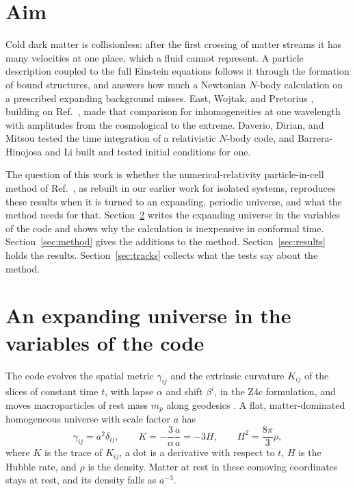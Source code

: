 \documentclass[aps,prd,twocolumn,10pt,superscriptaddress,nofootinbib,longbibliography,floatfix]{revtex4-2}
\begin{document}
\maketitle

\section{Aim}\label{sec:aim}

Cold dark matter is collisionless: after the first crossing of matter streams it has many velocities at one place, which a fluid cannot represent. A particle description coupled to the full Einstein equations follows it through the formation of bound structures, and answers how much a Newtonian $N$-body calculation on a prescribed expanding background misses. East, Wojtak, and Pretorius \cite{East:2019chx}, building on Ref.~\cite{East:2017qmk}, made that comparison for inhomogeneities at one wavelength with amplitudes from the cosmological to the extreme. Daverio, Dirian, and Mitsou \cite{Daverio:2019gql} tested the time integration of a relativistic $N$-body code, and Barrera-Hinojosa and Li \cite{Barrera-Hinojosa:2019mzo,Barrera-Hinojosa:2020arz} built and tested initial conditions for one.

The question of this work is whether the numerical-relativity particle-in-cell method of Ref.~\cite{Wu:2026nrpic}, as rebuilt in our earlier work for isolated systems, reproduces these results when it is turned to an expanding, periodic universe, and what the method needs for that. Section~\ref{sec:system} writes the expanding universe in the variables of the code and shows why the calculation is inexpensive in conformal time. Section~\ref{sec:method} gives the additions to the method. Section~\ref{sec:results} holds the results. Section~\ref{sec:tracks} collects what the tests say about the method.

\section{An expanding universe in the variables of the code}\label{sec:system}

The code evolves the spatial metric $\gamma_{ij}$ and the extrinsic curvature $K_{ij}$ of the slices of constant time $t$, with lapse $\alpha$ and shift $\beta^i$, in the Z4c formulation, and moves macroparticles of rest mass $m_p$ along geodesics \cite{Wu:2026nrpic}. A flat, matter-dominated homogeneous universe with scale factor $a$ has
\begin{equation}\label{eq:flrw}
\gamma_{ij} = a^2 \delta_{ij}, \qquad K = -\frac{3}{\alpha}\frac{\dot a}{a} = -3H, \qquad H^2 = \frac{8\pi}{3}\rho ,
\end{equation}
where $K$ is the trace of $K_{ij}$, a dot is a derivative with respect to $t$, $H$ is the Hubble rate, and $\rho$ is the density. Matter at rest in these comoving coordinates stays at rest, and its density falls as $a^{-3}$.
\end{document}
